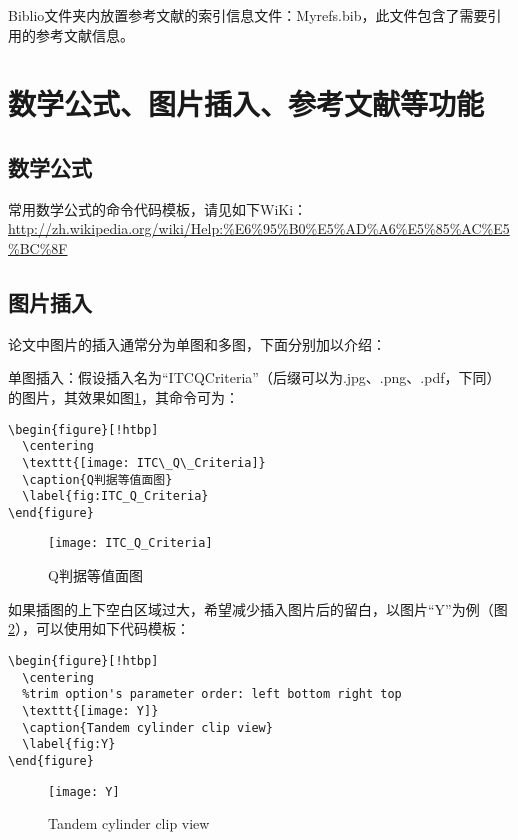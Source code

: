 Biblio文件夹内放置参考文献的索引信息文件：Myrefs.bib，此文件包含了需要引用的参考文献信息。

\section{数学公式、图片插入、参考文献等功能}

\subsection{数学公式}

常用数学公式的命令代码模板，请见如下WiKi：\url{http://zh.wikipedia.org/wiki/Help:%E6%95%B0%E5%AD%A6%E5%85%AC%E5%BC%8F}

\subsection{图片插入}

论文中图片的插入通常分为单图和多图，下面分别加以介绍：

单图插入：假设插入名为“ITC\textunderscore Q\textunderscore Criteria”（后缀可以为.jpg、.png、.pdf，下同）的图片，其效果如图\ref{fig:ITC_Q_Criteria}，其命令可为：
\begin{verbatim}
\begin{figure}[!htbp]
  \centering
  \texttt{[image: ITC\_Q\_Criteria]}
  \caption{Q判据等值面图}
  \label{fig:ITC_Q_Criteria}
\end{figure}
\end{verbatim}
\begin{figure}[!htbp]
  \centering
  \texttt{[image: ITC\_Q\_Criteria]}
  \caption{Q判据等值面图}
  \label{fig:ITC_Q_Criteria}
\end{figure}

如果插图的上下空白区域过大，希望减少插入图片后的留白，以图片“Y”为例（图\ref{fig:Y}），可以使用如下代码模板：
\begin{verbatim}
\begin{figure}[!htbp]
  \centering
  %trim option's parameter order: left bottom right top
  \texttt{[image: Y]}
  \caption{Tandem cylinder clip view}
  \label{fig:Y}
\end{figure}
\end{verbatim}
\begin{figure}[!htbp]
  \centering
  \texttt{[image: Y]}
  \caption{Tandem cylinder clip view}
  \label{fig:Y}
\end{figure}

